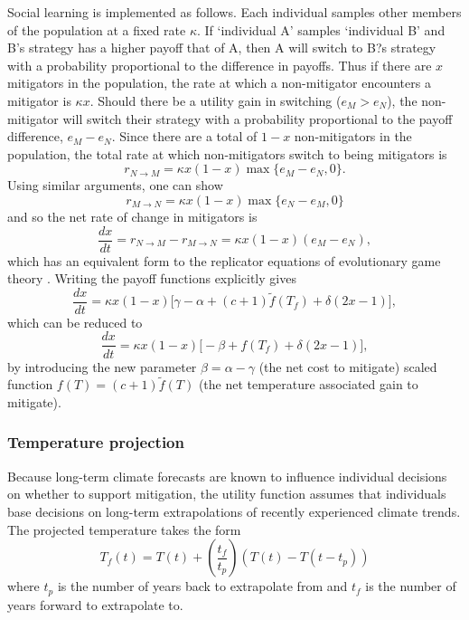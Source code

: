 \documentclass[10pt,letterpaper]{article}
\begin{document}
Social learning is implemented as follows. Each individual samples other members of the population at a fixed rate $\kappa$. If `individual A' samples `individual B' and B's strategy has a higher payoff that of A, then A will switch to B?s strategy with a probability proportional to the difference in payoffs. Thus if there are $x$ mitigators in the population, the rate at which a non-mitigator encounters a mitigator is $\kappa x$. Should there be a utility gain in switching ($e_M>e_N$), the non-mitigator will switch their strategy with a probability proportional to the payoff difference, $e_M-e_N$. Since there are a total of $1-x$ non-mitigators in the population, the total rate at which non-mitigators switch to being mitigators is
\begin{equation}
r_{N\to M} = \kappa x(1-x) \max \{e_M-e_N,0 \}.
\end{equation}
Using similar arguments, one can show
\begin{equation}
r_{M\to N} = \kappa x(1-x) \max \{e_N-e_M,0 \}
\end{equation}
and so the net rate of change in mitigators is
\begin{equation}
\frac{dx}{dt} = r_{N\to M} - r_{M \to N} = \kappa x(1-x)(e_M-e_N),
\end{equation}
which has an equivalent form to the replicator equations of evolutionary game theory \cite{hofbauer98}. Writing the payoff functions explicitly gives
\begin{equation}
\frac{dx}{dt} = \kappa x (1-x) \big[ \gamma-\alpha + (c+1)\tilde{f}(T_f) + \delta(2x-1)\big],
\end{equation}
which can be reduced to
\begin{equation}
\label{eq:model_x}
\frac{dx}{dt} = \kappa x (1-x) \big[ -\beta + f(T_f) + \delta(2x-1)\big],
\end{equation}
by introducing the new parameter $\beta = \alpha-\gamma$ (the net cost to mitigate) scaled function $f(T) = (c+1)\tilde{f}(T)$ (the net temperature associated gain to mitigate).


\subsubsection*{Temperature projection} Because long-term climate forecasts are known to influence individual decisions on whether to support mitigation\cite{weber10}, the utility function assumes that individuals base decisions on long-term extrapolations of recently experienced climate trends. The projected temperature takes the form
\begin{equation}
T_f(t) = T(t) + \left(\frac{t_f}{t_p}\right) (T(t)-T(t-t_p)) 
\end{equation}
where $t_p$ is the number of years back to extrapolate from and $t_f$ is the number of years forward to extrapolate to.
\end{document}
